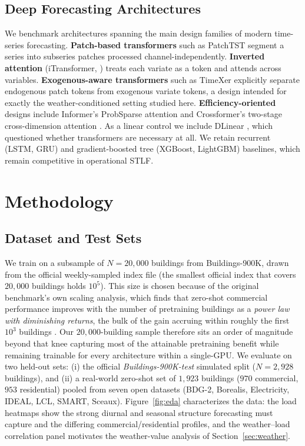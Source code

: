 \documentclass[11pt]{article}
\begin{document}
\subsection{Deep Forecasting Architectures}
\label{sec:related-arch}
We benchmark architectures spanning the main design families of modern time-series
forecasting. \textbf{Patch-based transformers} such as PatchTST \citep{patchtst}
segment a series into subseries patches processed channel-independently.
\textbf{Inverted attention} (iTransformer, \citealp{itransformer}) treats each
variate as a token and attends across variables. \textbf{Exogenous-aware
transformers} such as TimeXer \citep{timexer} explicitly separate endogenous patch
tokens from exogenous variate tokens, a design intended for exactly the
weather-conditioned setting studied here. \textbf{Efficiency-oriented} designs
include Informer's ProbSparse attention \citep{informer} and Crossformer's
two-stage cross-dimension attention \citep{crossformer}. As a linear control we
include DLinear \citep{dlinear}, which questioned whether transformers are
necessary at all. We retain recurrent (LSTM, GRU) and gradient-boosted tree
(XGBoost, LightGBM) baselines, which remain competitive in operational STLF. 

\section{Methodology}
\label{sec:method}

\subsection{Dataset and Test Sets}
\label{sec:dataset}
We train on a subsample of $N=20{,}000$ buildings from Buildings-900K, drawn from
the official weekly-sampled index file (the smallest official index that covers
$20{,}000$ buildings holds $10^{5}$). This size is chosen because of the original
benchmark's own scaling analysis, which finds that zero-shot commercial performance
improves with the number of pretraining buildings as a \emph{power law with
diminishing returns}, the bulk of the gain accruing within roughly the first
$10^{3}$ buildings \citep{buildingsbench2023}. Our $20{,}000$-building sample
therefore sits an order of magnitude beyond that knee capturing most of the
attainable pretraining benefit while remaining trainable for every architecture
within a single-GPU. We evaluate on two held-out sets: (i) the official \emph{Buildings-900K-test} simulated split
($N=2{,}928$ buildings), and (ii) a real-world zero-shot set of $1{,}923$ buildings
($970$ commercial, $953$ residential) pooled from seven open datasets (BDG-2,
Borealis, Electricity, IDEAL, LCL, SMART, Sceaux).
Figure~\ref{fig:eda} characterizes the data: the load
heatmaps show the strong diurnal and seasonal structure forecasting must capture
and the differing commercial/residential profiles, and the weather--load
correlation panel motivates the weather-value analysis of Section~\ref{sec:weather}.
\end{document}
